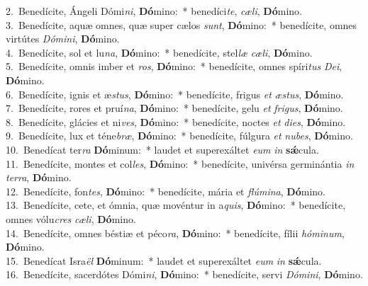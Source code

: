 {2.~}Benedícite, Ángeli Dómi\textit{ni}, \textbf{Dó}mino:~* benedíci\textit{te}, \textit{cæ}\textit{li}, \textbf{Dó}mino.\\
{3.~}Benedícite, aquæ omnes, quæ super cælos \textit{sunt}, \textbf{Dó}mino:~* benedícite, omnes virtútes \textit{Dó}\textit{mi}\textit{ni}, \textbf{Dó}mino.\\
{4.~}Benedícite, sol et lu\textit{na}, \textbf{Dó}mino:~* benedícite, stel\textit{læ} \textit{cæ}\textit{li}, \textbf{Dó}mino.\\
{5.~}Benedícite, omnis imber et \textit{ros}, \textbf{Dó}mino:~* benedícite, omnes spíri\textit{tus} \textit{De}\textit{i}, \textbf{Dó}mino.\\
{6.~}Benedícite, ignis et æ\textit{stus}, \textbf{Dó}mino:~* benedícite, frigus \textit{et} \textit{æ}\textit{stus}, \textbf{Dó}mino.\\
{7.~}Benedícite, rores et pruí\textit{na}, \textbf{Dó}mino:~* benedícite, gelu \textit{et} \textit{fri}\textit{gus}, \textbf{Dó}mino.\\
{8.~}Benedícite, glácies et ni\textit{ves}, \textbf{Dó}mino:~* benedícite, noctes \textit{et} \textit{di}\textit{es}, \textbf{Dó}mino.\\
{9.~}Benedícite, lux et téne\textit{bræ}, \textbf{Dó}mino:~* benedícite, fúlgura \textit{et} \textit{nu}\textit{bes}, \textbf{Dó}mino.\\
{10.~}Benedícat ter\textit{ra} \textbf{Dó}minum:~* laudet et superexáltet \textit{e}\textit{um} \textit{in} \textbf{sǽ}cula.\\
{11.~}Benedícite, montes et col\textit{les}, \textbf{Dó}mino:~* benedícite, univérsa germinántia \textit{in} \textit{ter}\textit{ra}, \textbf{Dó}mino.\\
{12.~}Benedícite, fon\textit{tes}, \textbf{Dó}mino:~* benedícite, mária et \textit{flú}\textit{mi}\textit{na}, \textbf{Dó}mino.\\
{13.~}Benedícite, cete, et ómnia, quæ movéntur in a\textit{quis}, \textbf{Dó}mino:~* benedícite, omnes vólu\textit{cres} \textit{cæ}\textit{li}, \textbf{Dó}mino.\\
{14.~}Benedícite, omnes béstiæ et péco\textit{ra}, \textbf{Dó}mino:~* benedícite, fílii \textit{hó}\textit{mi}\textit{num}, \textbf{Dó}mino.\\
{15.~}Benedícat Isra\textit{ël} \textbf{Dó}minum:~* laudet et superexáltet \textit{e}\textit{um} \textit{in} \textbf{sǽ}cula.\\
{16.~}Benedícite, sacerdótes Dómi\textit{ni}, \textbf{Dó}mino:~* benedícite, servi \textit{Dó}\textit{mi}\textit{ni}, \textbf{Dó}mino.\\
